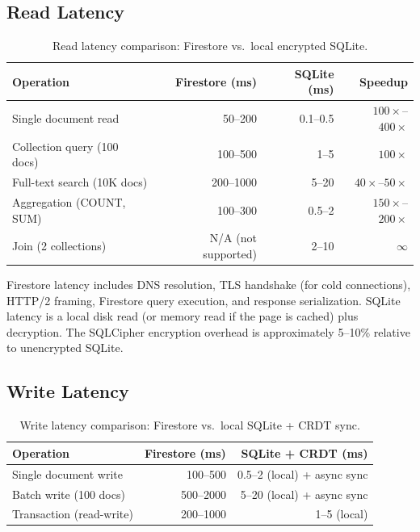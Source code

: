 \documentclass[11pt,a4paper]{article}
\begin{document}
\subsection{Read Latency}

\begin{table}[H]
\centering
\caption{Read latency comparison: Firestore vs.\ local encrypted SQLite.}
\label{tab:read-latency}
\begin{tabular}{lrrr}
\toprule
\textbf{Operation} & \textbf{Firestore (ms)} & \textbf{SQLite (ms)} & \textbf{Speedup} \\
\midrule
Single document read & 50--200 & 0.1--0.5 & $100\times$--$400\times$ \\
Collection query (100 docs) & 100--500 & 1--5 & $100\times$ \\
Full-text search (10K docs) & 200--1000 & 5--20 & $40\times$--$50\times$ \\
Aggregation (COUNT, SUM) & 100--300 & 0.5--2 & $150\times$--$200\times$ \\
Join (2 collections) & N/A (not supported) & 2--10 & $\infty$ \\
\bottomrule
\end{tabular}
\end{table}

Firestore latency includes DNS resolution, TLS handshake (for cold
connections), HTTP/2 framing, Firestore query execution, and response
serialization. SQLite latency is a local disk read (or memory read if
the page is cached) plus decryption. The SQLCipher encryption overhead
is approximately 5--10\% relative to unencrypted SQLite.

\subsection{Write Latency}

\begin{table}[H]
\centering
\caption{Write latency comparison: Firestore vs.\ local SQLite + CRDT sync.}
\label{tab:write-latency}
\begin{tabular}{lrr}
\toprule
\textbf{Operation} & \textbf{Firestore (ms)} & \textbf{SQLite + CRDT (ms)} \\
\midrule
Single document write & 100--500 & 0.5--2 (local) + async sync \\
Batch write (100 docs) & 500--2000 & 5--20 (local) + async sync \\
Transaction (read-write) & 200--1000 & 1--5 (local) \\
\bottomrule
\end{tabular}
\end{table}
\end{document}
